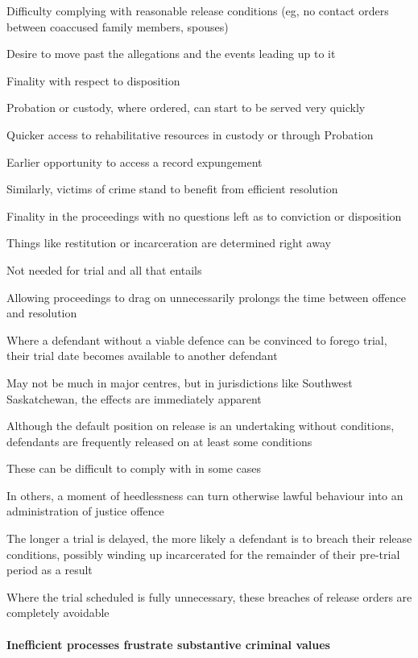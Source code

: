 Difficulty complying with reasonable release conditions (eg, no contact orders between coaccused family members, spouses)

Desire to move past the allegations and the events leading up to it

Finality with respect to disposition

Probation or custody, where ordered, can start to be served very quickly

Quicker access to rehabilitative resources in custody or through Probation

Earlier opportunity to access a record expungement

Similarly, victims of crime stand to benefit from efficient resolution

Finality in the proceedings with no questions left as to conviction or disposition

Things like restitution or incarceration are determined right away

Not needed for trial and all that entails

Allowing proceedings to drag on unnecessarily prolongs the time between offence and resolution

Where a defendant without a viable defence can be convinced to forego trial, their trial date becomes available to another defendant

May not be much in major centres, but in jurisdictions like Southwest Saskatchewan, the effects are immediately apparent

Although the default position on release is an undertaking without conditions, defendants are frequently released on at least some conditions

These can be difficult to comply with in some cases

In others, a moment of heedlessness can turn otherwise lawful behaviour into an administration of justice offence

The longer a trial is delayed, the more likely a defendant is to breach their release conditions, possibly winding up incarcerated for the remainder of their pre-trial period as a result

Where the trial scheduled is fully unnecessary, these breaches of release orders are completely avoidable

\paragraph{Inefficient processes frustrate substantive criminal values}

